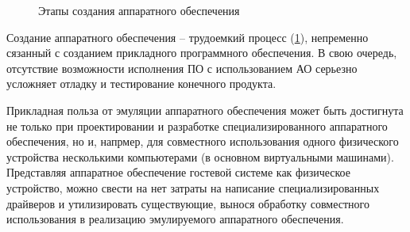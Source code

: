\begin{figure}[!htbp]
    \centering
    \caption{Этапы создания аппаратного обеспечения}\label{fig:hardware-design}
\end{figure}

Создание аппаратного обеспечения -- трудоемкий процесс (\cref{fig:hardware-design}),
непременно сязанный с созданием прикладного программного обеспечения.
В свою очередь, отсутствие возможности исполнения ПО с использованием АО серьезно усложняет отладку и тестирование конечного продукта.

Прикладная польза от эмуляции аппаратного обеспечения может быть достигнута не только
при проектировании и разработке специализированного аппаратного обеспечения, но и, напрмер,
для совместного использования одного физического устройства несколькими компьютерами (в основном
виртуальными машинами).
Представляя аппаратное обеспечение гостевой системе как физическое устройство, можно
свести на нет затраты на написание специализированных драйверов и утилизировать
существующие, вынося обработку совместного использования в реализацию эмулируемого аппаратного обеспечения.

